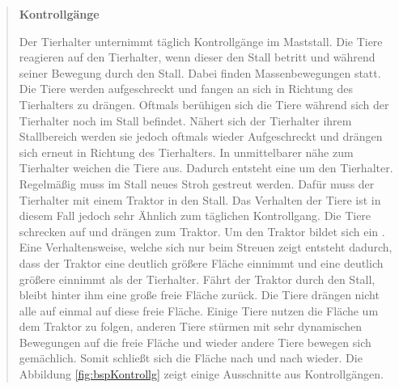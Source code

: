 \begin{quote}

\textbf{Kontrollgänge}\par
Der Tierhalter unternimmt täglich Kontrollgänge im Maststall. Die Tiere reagieren auf den Tierhalter, wenn dieser den Stall betritt und während seiner Bewegung durch den Stall. Dabei finden Massenbewegungen statt. Die Tiere werden aufgeschreckt und fangen an sich in Richtung des Tierhalters zu drängen. Oftmals berühigen sich die Tiere während sich der Tierhalter noch im Stall befindet. Nähert sich der Tierhalter ihrem Stallbereich werden sie jedoch oftmals wieder Aufgeschreckt und drängen sich erneut in Richtung des Tierhalters. In unmittelbarer nähe zum Tierhalter weichen die Tiere aus. Dadurch entsteht eine  um den Tierhalter. Regelmäßig muss im Stall neues Stroh gestreut werden. Dafür muss der Tierhalter mit einem Traktor in den Stall. Das Verhalten der Tiere ist in diesem Fall jedoch sehr Ähnlich zum täglichen Kontrollgang. Die Tiere schrecken auf und drängen zum Traktor. Um den Traktor bildet sich ein . Eine Verhaltensweise, welche sich nur beim Streuen zeigt entsteht dadurch, dass der Traktor eine deutlich größere Fläche einnimmt und eine deutlich größere   einnimmt als der Tierhalter. Fährt der Traktor durch den Stall, bleibt hinter ihm eine große freie Fläche zurück. Die Tiere drängen nicht alle auf einmal auf diese freie Fläche. Einige Tiere nutzen die Fläche um dem Traktor zu folgen, anderen Tiere stürmen mit sehr dynamischen Bewegungen auf die freie Fläche und wieder andere Tiere bewegen sich gemächlich. Somit schließt sich die Fläche nach und nach wieder. Die Abbildung \ref{fig:bspKontrollg} zeigt einige Ausschnitte aus Kontrollgängen. 
\end{quote}


